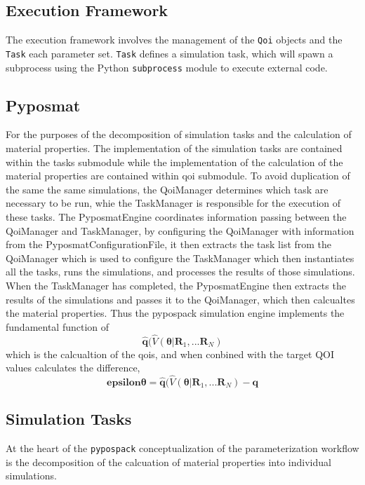 \subsection{Execution Framework}

The execution framework involves the management of the \verb|Qoi| objects and the \verb|Task| each parameter set.  \verb|Task| defines a simulation task, which will spawn a subprocess using the Python \verb|subprocess| module to execute external code.

\subsection{Pyposmat}
For the purposes of the decomposition of simulation tasks and the calculation of material properties.  The implementation of the simulation tasks are contained within the tasks submodule while the implementation of the calculation of the material properties are contained within qoi submodule.  To avoid duplication of the same the same simulations, the QoiManager determines which task are necessary to be run, whie the TaskManager is responsible for the execution of these tasks.  The PyposmatEngine coordinates information passing between the QoiManager and TaskManager, by configuring the QoiManager with information from the PyposmatConfigurationFile, it then extracts the task list from the QoiManager which is used to configure the TaskManager which then instantiates all the tasks, runs the simulations, and processes the results of those simulations.  When the TaskManager has completed, the PyposmatEngine then extracts the results of the simulations and passes it to the QoiManager, which then calcualtes the material properties.  Thus the pypospack simulation engine implements the fundamental function of
\begin{equation}
    \bm{\hat{q}}(\hat{V}(\bm{\theta}|\bm{R}_1,...\bm{R}_N)
\end{equation}
which is the calcualtion of the qois, and when conbined with the target QOI values calculates the difference,
\begin{equation}
    \bm{epsilon{\theta}}=\bm{\hat{q}}(\hat{V}(\bm{\theta}|\bm{R}_1,...\bm{R}_N)-\bm{q}
\end{equation}

\subsection{Simulation Tasks}
At the heart of the \verb|pypospack| conceptualization of the parameterization workflow is the decomposition of the calcuation of material properties into individual simulations.

